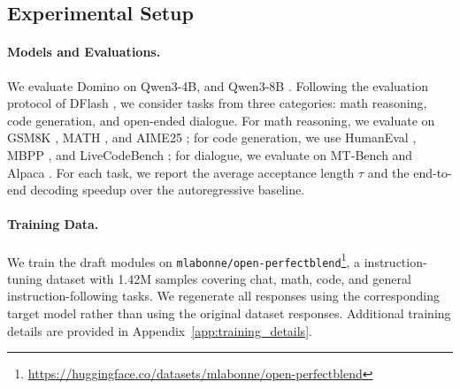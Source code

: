 
\label{sec:experiments}
\subsection{Experimental Setup}

\paragraph{Models and Evaluations.}
We evaluate Domino on Qwen3-4B, and Qwen3-8B \citep{qwen2025qwen3}. Following the evaluation protocol of DFlash \citep{chen2026dflash}, we consider tasks from three categories: math reasoning, code generation, and open-ended dialogue. For math reasoning, we evaluate on GSM8K \citep{cobbe2021training}, MATH \citep{hendrycks2021measuring}, and AIME25 \citep{maa2025aime}; for code generation, we use HumanEval \citep{chen2021evaluating}, MBPP \citep{austin2021program}, and LiveCodeBench \citep{jain2024livecodebench}; for dialogue, we evaluate on MT-Bench \citep{zheng2023judging} and Alpaca \citep{taori2023alpaca}. For each task, we report the average acceptance length \(\tau\) and the end-to-end decoding speedup over the autoregressive baseline.

\paragraph{Training Data.}
We train the draft modules on \texttt{mlabonne/open-perfectblend}\footnote{\url{https://huggingface.co/datasets/mlabonne/open-perfectblend}}, a instruction-tuning dataset with 1.42M samples covering chat, math, code, and general instruction-following tasks. We regenerate all responses using the corresponding target model rather than using the original dataset responses. Additional training details are provided in Appendix~\ref{app:training_details}.


